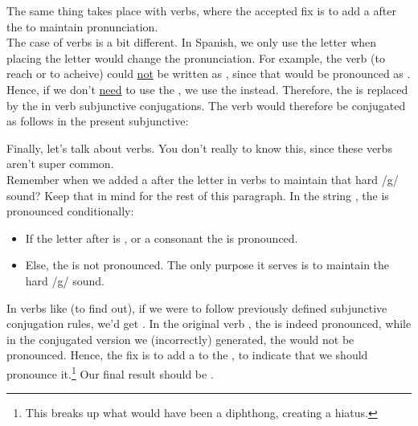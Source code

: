 The same thing takes place with  verbs, where the accepted fix is to add a  after the  to maintain pronunciation.\\ 

The case of  verbs is a bit different. In Spanish, we only use the letter  when placing the letter  would change the pronunciation. For example, the verb  (to reach or to acheive) could \underline{not} be written as \sout{}, since that would be pronounced as . Hence, if we don't \underline{need} to use the , we use the  instead. Therefore, the  is replaced by the  in  verb subjunctive conjugations. The verb  would therefore be conjugated as follows in the present subjunctive:\\





Finally, let's talk about  verbs. You don't really  to know this, since these verbs aren't super common.\\

Remember when we added a  after the letter  in  verbs to maintain that hard /g/ sound? Keep that in mind for the rest of this paragraph. In the string , the  is pronounced conditionally:

\begin{itemize}[noitemsep]
	\item If the letter after  is , or a consonant the  is pronounced. 
	\item Else, the  is not pronounced. The only purpose it serves is to maintain the hard /g/ sound. 
\end{itemize}

In verbs like  (to find out), if we were to follow previously
defined subjunctive conjugation rules, we'd get \sout{}. In the
original verb , the  is indeed pronounced, while in the
conjugated version we (incorrectly) generated, the  would not be
pronounced. Hence, the fix is to add a  to the , to
indicate that we should pronounce it.\footnote{This breaks up what would have
been a diphthong, creating a hiatus.} Our final result should be .

